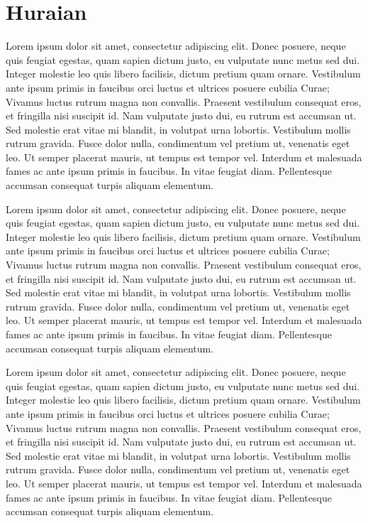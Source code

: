 \chapter{Huraian}

Lorem ipsum dolor sit amet, consectetur adipiscing elit. Donec posuere, neque quis feugiat egestas, quam sapien dictum justo, eu vulputate nunc metus sed dui. Integer molestie leo quis libero facilisis, dictum pretium quam ornare. Vestibulum ante ipsum primis in faucibus orci luctus et ultrices posuere cubilia Curae; Vivamus luctus rutrum magna non convallis. Praesent vestibulum consequat eros, et fringilla nisi suscipit id. Nam vulputate justo dui, eu rutrum est accumsan ut. Sed molestie erat vitae mi blandit, in volutpat urna lobortis. Vestibulum mollis rutrum gravida. Fusce dolor nulla, condimentum vel pretium ut, venenatis eget leo. Ut semper placerat mauris, ut tempus est tempor vel. Interdum et malesuada fames ac ante ipsum primis in faucibus. In vitae feugiat diam. Pellentesque accumsan consequat turpis aliquam elementum.

Lorem ipsum dolor sit amet, consectetur adipiscing elit. Donec posuere, neque quis feugiat egestas, quam sapien dictum justo, eu vulputate nunc metus sed dui. Integer molestie leo quis libero facilisis, dictum pretium quam ornare. Vestibulum ante ipsum primis in faucibus orci luctus et ultrices posuere cubilia Curae; Vivamus luctus rutrum magna non convallis. Praesent vestibulum consequat eros, et fringilla nisi suscipit id. Nam vulputate justo dui, eu rutrum est accumsan ut. Sed molestie erat vitae mi blandit, in volutpat urna lobortis. Vestibulum mollis rutrum gravida. Fusce dolor nulla, condimentum vel pretium ut, venenatis eget leo. Ut semper placerat mauris, ut tempus est tempor vel. Interdum et malesuada fames ac ante ipsum primis in faucibus. In vitae feugiat diam. Pellentesque accumsan consequat turpis aliquam elementum.

Lorem ipsum dolor sit amet, consectetur adipiscing elit. Donec posuere, neque quis feugiat egestas, quam sapien dictum justo, eu vulputate nunc metus sed dui. Integer molestie leo quis libero facilisis, dictum pretium quam ornare. Vestibulum ante ipsum primis in faucibus orci luctus et ultrices posuere cubilia Curae; Vivamus luctus rutrum magna non convallis. Praesent vestibulum consequat eros, et fringilla nisi suscipit id. Nam vulputate justo dui, eu rutrum est accumsan ut. Sed molestie erat vitae mi blandit, in volutpat urna lobortis. Vestibulum mollis rutrum gravida. Fusce dolor nulla, condimentum vel pretium ut, venenatis eget leo. Ut semper placerat mauris, ut tempus est tempor vel. Interdum et malesuada fames ac ante ipsum primis in faucibus. In vitae feugiat diam. Pellentesque accumsan consequat turpis aliquam elementum.